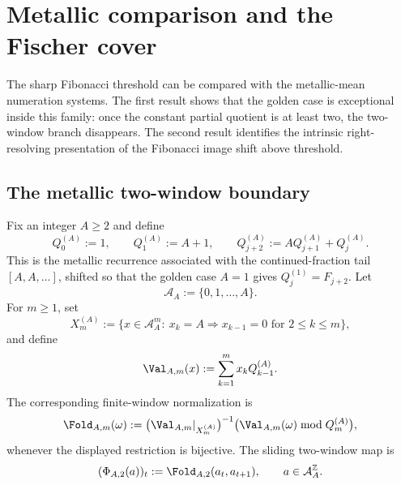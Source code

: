 \section{Metallic comparison and the Fischer cover}\label{sec:metallic-cover}

The sharp Fibonacci threshold can be compared with the metallic-mean
numeration systems. The first result shows that the golden case is exceptional
inside this family: once the constant partial quotient is at least two, the
two-window branch disappears. The second result identifies the intrinsic
right-resolving presentation of the Fibonacci image shift above threshold.

\subsection{The metallic two-window boundary}

\begin{definition}\label{def:metallic-window-data}
Fix an integer $A\ge 2$ and define
\[
Q_0^{(A)}:=1,\qquad Q_1^{(A)}:=A+1,\qquad
Q_{j+2}^{(A)}:=A Q_{j+1}^{(A)}+Q_j^{(A)}.
\]
This is the metallic recurrence associated with the continued-fraction tail
$[A,A,\ldots]$, shifted so that the golden case $A=1$ gives
$Q_j^{(1)}=F_{j+2}$.
Let
\[
\mathcal A_A:=\{0,1,\ldots,A\}.
\]
For $m\ge 1$, set
\[
X_m^{(A)}
:=
\{x\in \mathcal A_A^m:\ x_k=A\Rightarrow x_{k-1}=0
\text{ for }2\le k\le m\},
\]
and define
\[
\Val_{A,m}(x):=\sum_{k=1}^m x_k Q_{k-1}^{(A)}.
\]
The corresponding finite-window normalization is
\[
\Fold_{A,m}(\omega)
:=
\bigl(\Val_{A,m}|_{X_m^{(A)}}\bigr)^{-1}
\bigl(\Val_{A,m}(\omega)\bmod Q_m^{(A)}\bigr),
\]
whenever the displayed restriction is bijective.  The sliding two-window map is
\[
(\Phi_{A,2}(a))_t:=\Fold_{A,2}(a_t,a_{t+1}),
\qquad a\in \mathcal A_A^{\mathbb Z}.
\]
\end{definition}

